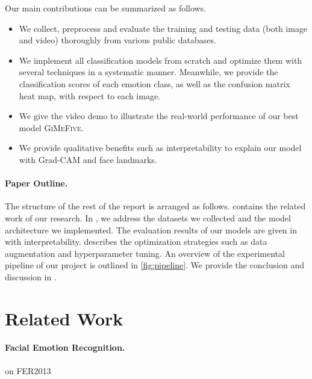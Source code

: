 Our main contributions can be summarized as follows. 
\begin{itemize}
  \item We collect, preprocess and evaluate the training and testing data 
  (both image and video) thoroughly from various public databases. 
  \item We implement all classification models from scratch and optimize them with several techniques in a systematic manner. 
  Meanwhile, we provide the classification scores of each emotion class, 
  as well as the confusion matrix heat map, with respect to each image. 
  \item We give the video demo to illustrate the real-world performance of our best model \textsc{GiMeFive}. 
  \item We provide qualitative benefits such as interpretability to explain our model with Grad-CAM and face landmarks.
\end{itemize}

\paragraph{Paper Outline.}
The structure of the rest of the report is arranged as follows. 
 contains the related work of our research. 
In , 
we address the datasets we collected and the model architecture we implemented. 
The evaluation results of our models are given in  with interpretability. 
 describes the optimization strategies such as data augmentation and hyperparameter tuning. 
An overview of the experimental pipeline of our project is outlined in \cref{fig:pipeline}. 
We provide the conclusion and discussion in . 

\section{Related Work}
\label{sec:related}


\paragraph{Facial Emotion Recognition.}
\citet{PhamVT20} on FER2013

